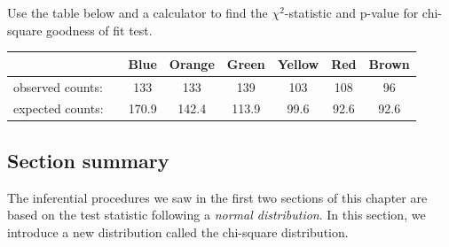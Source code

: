 \begin{exercisewrap}
\begin{nexercise}
Use the table below and a calculator to find the $\chi^2$-statistic and p-value for chi-square goodness of fit test.\footnotemark
\begin{center}
\begin{tabular}{ll ccc ccc}
\hline
	 & \hspace{1mm} & Blue & Orange & Green & Yellow & Red & Brown\\
\hline
observed counts:&		& 133 & 133 & 139 & 103 & 108 & 96  \\
expected counts:&		& 170.9 &  142.4 & 113.9 & 99.6 & 92.6 & 92.6\\
\hline
\end{tabular}
\end{center}

\end{nexercise}
\end{exercisewrap}


\D{\newpage}

\subsection*{Section summary} 
\noindent The inferential procedures we saw in the first two sections of this chapter are based on the test statistic following a \textit{normal distribution}.  In this section, we introduce a new distribution called the chi-square distribution.  

